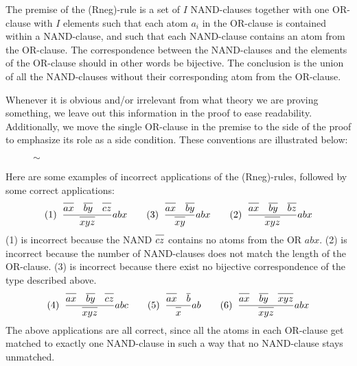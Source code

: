 The premise of the (Rneg)-rule is a set of $I$ NAND-clauses together with one OR-clause with $I$ elements such that each atom $a_i$ in the OR-clause is contained within a NAND-clause, and such that each NAND-clause contains an atom from the OR-clause.
The correspondence between the NAND-clauses and the elements of the OR-clause should in other words be bijective.
The conclusion is the union of all the NAND-clauses without their corresponding atom from the OR-clause.

Whenever it is obvious and/or irrelevant from what theory we are proving something, we leave out this information in the proof to ease readability.
Additionally, we move the single OR-clause in the premise to the side of the proof to emphasize its role as a side condition.
These conventions are illustrated below:\par
\begin{figure}[!h]
  \centering
  \begin{prooftree}
  \end{prooftree}
  \hspace{2mm} $\sim$ \hspace{2mm}
  \begin{prooftree}
  \end{prooftree}
  \caption{}
  \label{fig:proof_convention}
\end{figure}
Here are some examples of incorrect applications of the (Rneg)-rules, followed by some correct applications:
\begin{align}
  (1)\;\;\frac{\ol{ax}\quad\ol{by}\quad\ol{cz}}{\ol{xyz}}abx\quad\quad
  (3)\;\;\frac{\ol{ax}\quad\ol{by}}{\ol{xy}}abx\quad\quad
  (2)\;\;\frac{\ol{ax}\quad\ol{by}\quad\ol{bz}}{\ol{xyz}}abx
\end{align}
(1) is incorrect because the NAND $\ol{cz}$ contains no atoms from the OR $abx$.
(2) is incorrect because the number of NAND-clauses does not match the length of the OR-clause.
(3) is incorrect because there exist no bijective correspondence of the type described above.
\begin{align}
  (4)\;\;\frac{\ol{ax}\quad\ol{by}\quad\ol{cz}}{\ol{xyz}}abc\quad\quad
  (5)\;\;\frac{\ol{ax}\quad\ol{b}}{\ol{x}}ab\quad\quad
  (6)\;\;\frac{\ol{ax}\quad\ol{by}\quad\ol{xyz}}{\ol{xyz}}abx
\end{align}
The above applications are all correct, since all the atoms in each OR-clause get matched to exactly one NAND-clause in such a way that no NAND-clause stays unmatched.

